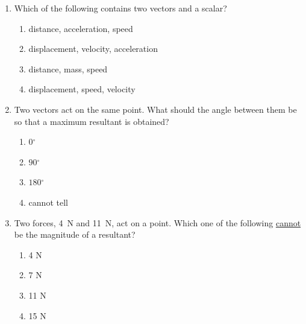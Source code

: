\begin{enumerate}[noitemsep, label=\textbf{\arabic*}. ]
\begin{figure}[H]
\begin{center}
      \vspace{2pt}
    \vspace{.1in}
    
    \end{center}

 \end{figure}   

    \addtocounter{footnote}{-0}
            \label{m38819*uid102}\item Which of the following contains two vectors and a scalar?
\label{m38819*id197890}\begin{enumerate}[noitemsep, label=\textbf{\alph*}. ] 
            \label{m38819*uid103}\item distance, acceleration, speed
\label{m38819*uid104}\item displacement, velocity, acceleration
\label{m38819*uid105}\item distance, mass, speed
\label{m38819*uid106}\item displacement, speed, velocity
\end{enumerate}
                \label{m38819*uid107}\item Two vectors act on the same point. What should the angle between them be so that a maximum resultant is obtained?
\label{m38819*id197965}\begin{enumerate}[noitemsep, label=\textbf{\alph*}. ] 
            \label{m38819*uid108}\item \begin{math}0{}^{\circ }\end{math}\label{m38819*uid109}\item \begin{math}90{}^{\circ }\end{math}\label{m38819*uid110}\item \begin{math}180{}^{\circ }\end{math}\label{m38819*uid111}\item cannot tell
\end{enumerate}
                \label{m38819*uid112}\item Two forces, 4~N and 11~N, act on a point. Which one of the following \uline{cannot} be the magnitude of a resultant?
\label{m38819*id198082}\begin{enumerate}[noitemsep, label=\textbf{\alph*}. ] 
            \label{m38819*uid113}\item 4 N
\label{m38819*uid114}\item 7 N
\label{m38819*uid115}\item 11 N
\label{m38819*uid116}\item 15 N
\end{enumerate}
        \newline
            \end{enumerate}
        
